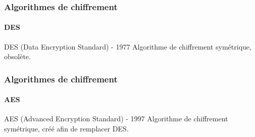         \begin{frame}
            \frametitle{Algorithmes de chiffrement}
            \framesubtitle{DES}
            \begin{block}{DES (Data Encryption Standard) - 1977}
                Algorithme de chiffrement symétrique, obsolète.
            \end{block}
        \end{frame}

        \begin{frame}
            \frametitle{Algorithmes de chiffrement}
            \framesubtitle{AES}
            \begin{block}{AES (Advanced Encryption Standard) - 1997}
                Algorithme de chiffrement symétrique, créé afin de remplacer DES.
            \end{block}
        \end{frame}

